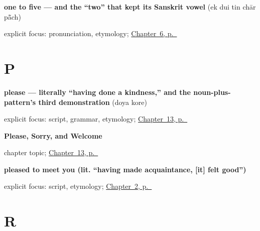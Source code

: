 \noindent\begin{minipage}[t]{\linewidth}
\raggedright
\textbf{one to five — and the \textquotedblleft{}two\textquotedblright{} that kept its Sanskrit vowel}\enspace\emph{    }\enspace(ek dui tin chār pā̃ch)\par
\footnotesize explicit focus: pronunciation, etymology; \hyperref[ch:numbers-one-to-five]{Chapter~6, p.~\pageref*{ch:numbers-one-to-five}}
\end{minipage}\par\smallskip

\section*{P}

\noindent\begin{minipage}[t]{\linewidth}
\raggedright
\textbf{please — literally \textquotedblleft{}having done a kindness,\textquotedblright{} and the noun-plus- pattern's third demonstration}\enspace\emph{ }\enspace(doya kore)\par
\footnotesize explicit focus: script, grammar, etymology; \hyperref[ch:bn-please-sorry-welcome]{Chapter~13, p.~\pageref*{ch:bn-please-sorry-welcome}}
\end{minipage}\par\smallskip

\noindent\begin{minipage}[t]{\linewidth}
\raggedright
\textbf{Please, Sorry, and Welcome}\par
\footnotesize chapter topic; \hyperref[ch:bn-please-sorry-welcome]{Chapter~13, p.~\pageref*{ch:bn-please-sorry-welcome}}
\end{minipage}\par\smallskip

\noindent\begin{minipage}[t]{\linewidth}
\raggedright
\textbf{pleased to meet you (lit. \textquotedblleft{}having made acquaintance, {[}it{]} felt good\textquotedblright{})}\enspace\emph{   }\par
\footnotesize explicit focus: script, etymology; \hyperref[ch:introductions]{Chapter~2, p.~\pageref*{ch:introductions}}
\end{minipage}\par\smallskip

\section*{R}

